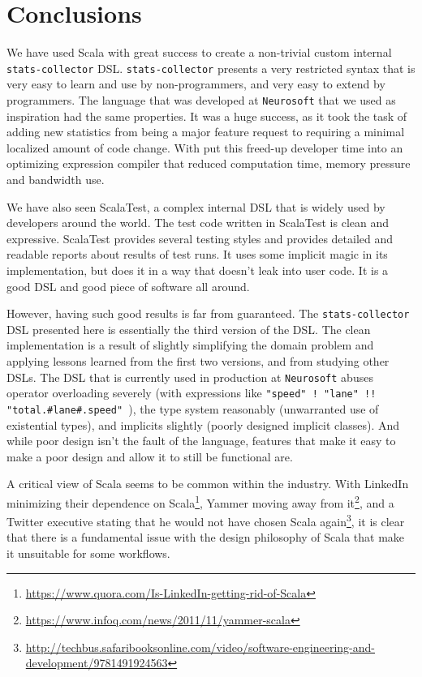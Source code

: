 \chapter{Conclusions}

We have used Scala with great success to create a non-trivial custom internal \texttt{stats-collector} DSL.
\texttt{stats-collector} presents a very restricted syntax that is very easy to learn and use by non-programmers, and very easy to extend by programmers.
The language that was developed at \texttt{Neurosoft} that we used as inspiration had the same properties.
It was a huge success, as it took the task of adding new statistics from being a major feature request to requiring a minimal localized amount of code change.
With put this freed-up developer time into an optimizing expression compiler that reduced computation time, memory pressure and bandwidth use.

We have also seen ScalaTest, a complex internal DSL that is widely used by developers around the world.
The test code written in ScalaTest is clean and expressive.
ScalaTest provides several testing styles and provides detailed and readable reports about results of test runs.
It uses some implicit magic in its implementation, but does it in a way that doesn't leak into user code.
It is a good DSL and good piece of software all around.

However, having such good results is far from guaranteed.
The \texttt{stats-collector} DSL presented here is essentially the third version of the DSL.
The clean implementation is a result of slightly simplifying the domain problem and applying lessons learned from the first two versions, and from studying other DSLs.
The DSL that is currently used in production at \texttt{Neurosoft} abuses operator overloading severely (with expressions like \texttt{"speed" ! "lane" !! "total.\#lane\#.speed" }), the type system reasonably (unwarranted use of existential types), and implicits slightly (poorly designed implicit classes).
And while poor design isn't the fault of the language, features that make it easy to make a poor design and allow it to still be functional are.

A critical view of Scala seems to be common within the industry.
With LinkedIn minimizing their dependence on Scala\footnote{\url{https://www.quora.com/Is-LinkedIn-getting-rid-of-Scala}}, Yammer moving away from it\footnote{\url{https://www.infoq.com/news/2011/11/yammer-scala}}, and a Twitter executive stating that he would not have chosen Scala again\footnote{\url{http://techbus.safaribooksonline.com/video/software-engineering-and-development/9781491924563}}, it is clear that there is a fundamental issue with the design philosophy of Scala that make it unsuitable for some workflows.

